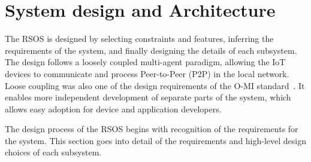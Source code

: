 \chapter{System design and Architecture}
\label{chapter:methods}



The RSOS is designed by selecting constraints and features, inferring the requirements of the system, and finally designing the details of each subsystem. The design follows a loosely coupled multi-agent paradigm, allowing the IoT devices to communicate and process Peer-to-Peer (P2P) in the local network. Loose coupling was also one of the design requirements of the O-MI standard~\cite{Gathering_Product_Data_from_Smart_Products}. It enables more independent development of separate parts of the system, which allows easy adoption for device and application developers.





The design process of the RSOS begins with recognition of the requirements for the system. This section goes into detail of the requirements and high-level design choices of each subsystem. %


